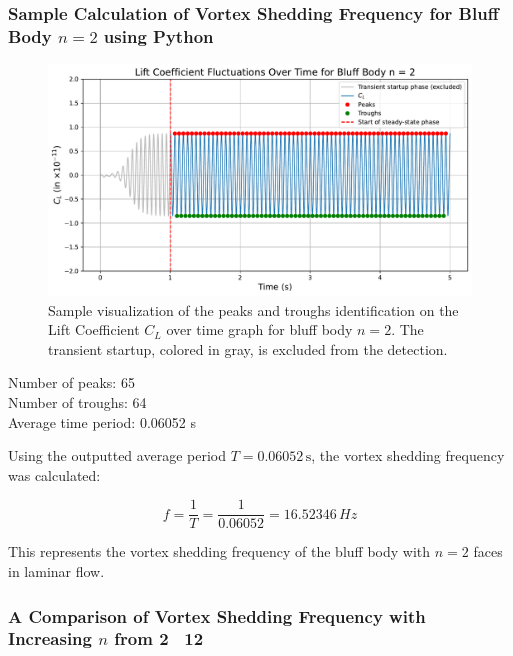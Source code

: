 \subsubsection{Sample Calculation of Vortex Shedding Frequency for Bluff Body $n=2$ using Python}

\begin{figure}[H]
	\centering
	\includegraphics[width=\textwidth]{images/2face_graph_sample_Calc}
	\caption{Sample visualization of the peaks and troughs identification on the Lift Coefficient $C_L$ over time graph for bluff body $n=2$. The transient startup, colored in gray, is excluded from the detection.}
	\label{fig:2FaceGraphSampleCalc} 
\end{figure}

\begin{tcolorbox}[title=Python Output,fonttitle=\bfseries,
	colframe=black!75!white,colback=gray!10!white,boxrule=0.5pt,
	fontupper=\ttfamily]
	Number of peaks:    65 \\
	Number of troughs:  64 \\
	
	Average time period: 0.06052 s \\
\end{tcolorbox}

Using the outputted average period \( T = 0.06052 \, \text{s} \), the vortex shedding frequency was calculated:

\[
f = \frac{1}{T} = \frac{1}{0.06052} = 16.52346 \, Hz
\]

This represents the vortex shedding frequency of the bluff body with \( n = 2 \) faces in laminar flow.

\subsubsection{A Comparison of Vortex Shedding Frequency with Increasing $n$ from 2 \textendash\ 12}

